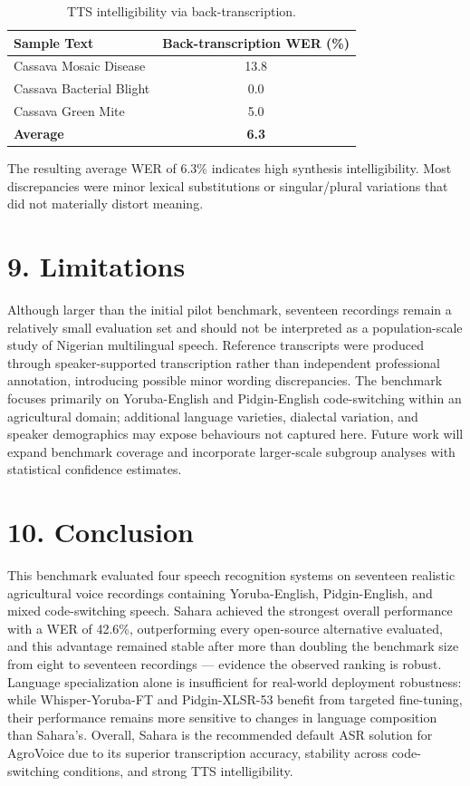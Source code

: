 \documentclass[9pt,twocolumn]{article}
\begin{document}
\begin{table}[h]
\centering
\small
\begin{tabular}{lc}
\toprule
Sample Text & Back-transcription WER (\%) \\
\midrule
Cassava Mosaic Disease & 13.8 \\
Cassava Bacterial Blight & 0.0 \\
Cassava Green Mite & 5.0 \\
\midrule
\textbf{Average} & \textbf{6.3} \\
\bottomrule
\end{tabular}
\caption{TTS intelligibility via back-transcription.}
\end{table}

The resulting average WER of 6.3\% indicates high synthesis intelligibility. Most discrepancies were minor lexical substitutions or singular/plural variations that did not materially distort meaning.

\section*{9. Limitations}
Although larger than the initial pilot benchmark, seventeen recordings remain a relatively small evaluation set and should not be interpreted as a population-scale study of Nigerian multilingual speech. Reference transcripts were produced through speaker-supported transcription rather than independent professional annotation, introducing possible minor wording discrepancies. The benchmark focuses primarily on Yoruba-English and Pidgin-English code-switching within an agricultural domain; additional language varieties, dialectal variation, and speaker demographics may expose behaviours not captured here. Future work will expand benchmark coverage and incorporate larger-scale subgroup analyses with statistical confidence estimates.

\section*{10. Conclusion}
This benchmark evaluated four speech recognition systems on seventeen realistic agricultural voice recordings containing Yoruba-English, Pidgin-English, and mixed code-switching speech. Sahara achieved the strongest overall performance with a WER of 42.6\%, outperforming every open-source alternative evaluated, and this advantage remained stable after more than doubling the benchmark size from eight to seventeen recordings --- evidence the observed ranking is robust. Language specialization alone is insufficient for real-world deployment robustness: while Whisper-Yoruba-FT and Pidgin-XLSR-53 benefit from targeted fine-tuning, their performance remains more sensitive to changes in language composition than Sahara's. Overall, Sahara is the recommended default ASR solution for AgroVoice due to its superior transcription accuracy, stability across code-switching conditions, and strong TTS intelligibility.
\end{document}
